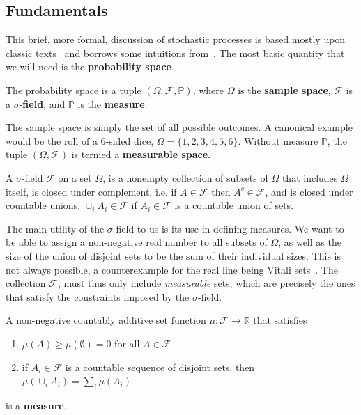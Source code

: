 \subsection{Fundamentals}
This brief, more formal, discussion of stochastic processes is based mostly upon classic texts~\cite{durrett2019probability, rogers1994diffusions, rogers2000diffusions} and borrows some intuitions from~\cite{sarkka2019applied}. The most basic quantity that we will need is the \textbf{probability space}. 
\begin{definition}
	The probability space is a tuple $(\Omega, \mathcal{F}, \mathbb{P})$, where $\Omega$ is the \textbf{sample space}, $\mathcal{F}$ is a $\sigma$-\textbf{field}, and $\mathbb{P}$ is the \textbf{measure}.
\end{definition}
The sample space is simply the set of all possible outcomes. A canonical example would be the roll of a 6-sided dice, $\Omega=\{1, 2, 3, 4, 5, 6\}$. Without measure $\mathbb{P}$, the tuple $(\Omega, \mathcal{F})$ is termed a \textbf{measurable space}.
\begin{definition}
	A $\sigma$-field $\mathcal{F}$ on a set $\Omega$, is a nonempty collection of subsets of $\Omega$ that includes $\Omega$ itself, is closed under complement, i.e. if $A \in \mathcal{F}$ then $A^c \in \mathcal{F}$, and is closed under countable unions, $\cup_{i} A_{i} \in \mathcal{F}$ if $A_{i} \in \mathcal{F}$ is a countable union of sets.
\end{definition}
The main utility of the $\sigma$-field to us is its use in defining measures. We want to be able to assign a non-negative real number to all subsets of $\Omega$, as well as the size of the union of disjoint sets to be the sum of their individual sizes. This is not always possible, a counterexample for the real line being Vitali sets~\cite{samuel2013simple}. The collection $\mathcal{F}$, must thus only include \emph{measurable} sets, which are precisely the ones that satisfy the constraints imposed by the $\sigma$-field.
\begin{definition}[Measure]
	A non-negative countably additive set function $\mu: \mathcal{F} \rightarrow \mathbb{R}$ that satisfies
	\begin{enumerate}[label=\roman*)]
		\item $\mu(A) \geq \mu(\emptyset)=0$ for all $A \in \mathcal{F}$
		\item if $A_{i} \in \mathcal{F}$ is a countable sequence of disjoint sets, then $\mu\left(\cup_{i} A_{i}\right)=\sum_{i} \mu\left(A_{i}\right)$
	\end{enumerate}
	is a \textbf{measure}.
\end{definition}
